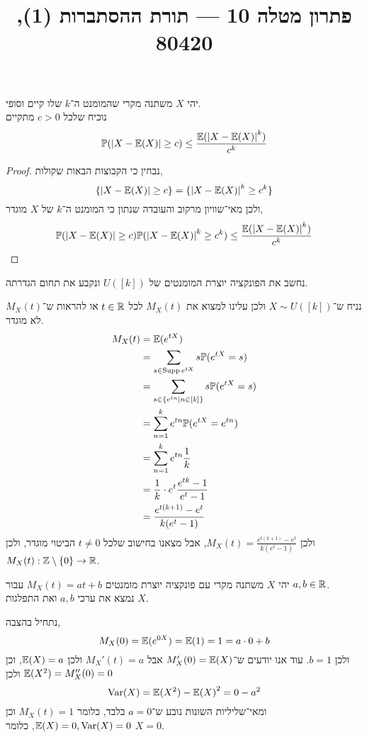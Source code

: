 
\title{פתרון מטלה 10 --- תורת ההסתברות (1), 80420}

\DeclareMathOperator{\Supp}{Supp}


\maketitle
\maketitleprint{}

\question{}
יהי $X$ משתנה מקרי שהמומנט ה־$k$ שלו קיים וסופי. \\
נוכיח שלכל $c > 0$ מתקיים
\[
	\mathbb{P}(|X - \mathbb{E}(X)| \ge c)
	\le \frac{\mathbb{E}({\left\lvert X - \mathbb{E}(X)\right\rvert}^k)}{c^k}
\]
\begin{proof}
	נבחין כי הקבוצות הבאות שקולות,
	\[
		\{ |X - \mathbb{E}(X)| \ge c \}
		= \{ {|X - \mathbb{E}(X)|}^k \ge c^k \}
	\]
	ולכן מאי־שוויון מרקוב והעובדה שנתון כי המומנט ה־$k$ של $X$ מוגדר,
	\[
		\mathbb{P}(|X - \mathbb{E}(X)| \ge c)
		\mathbb{P}({|X - \mathbb{E}(X)|}^k \ge c^k)
		\le \frac{\mathbb{E}({|X - \mathbb{E}(X)|}^k)}{c^k}
	\]
\end{proof}

\question{}
נחשב את הפונקציה יוצרת המומנטים של $U([k])$ ונקבע את תחום הגדרתה.
\begin{solution}
	נניח ש־$X \sim U([k])$ ולכן עלינו למצוא את $M_X(t)$ לכל $t \in \mathbb{R}$ או להראות ש־$M_X(t)$ לא מוגדר.
	\begin{align*}
		M_X(t)
		& = \mathbb{E}(e^{t X}) \\
		& = \sum_{s \in \operatorname{Supp} e^{t X}} s \mathbb{P}(e^{t X} = s) \\
		& = \sum_{s \in \{ e^{tn} \mid n \in [k]\}} s \mathbb{P}(e^{t X} = s) \\
		& = \sum_{n = 1}^{k} e^{tn} \mathbb{P}(e^{tX} = e^{tn}) \\
		& = \sum_{n = 1}^{k} e^{tn} \frac{1}{k} \\
		& = \frac{1}{k} \cdot e^t \frac{e^{tk} - 1}{e^t - 1} \\
		& = \frac{e^{t(k + 1)} - e^t}{k(e^t - 1)}
	\end{align*}
	ולכן $M_X(t) = \frac{e^{t(k + 1)} - e^t}{k(e^t - 1)}$, אבל מצאנו בחישוב שלכל $t \ne 0$ הביטוי מוגדר, ולכן $M_X(t) : \mathbb{Z} \setminus \{ 0 \} \to \mathbb{R}$.
\end{solution}

\question{}
יהי $X$ משתנה מקרי עם פונקציה יוצרת מומנטים $M_X(t) = at + b$ עבור $a, b \in \mathbb{R}$. \\
נמצא את ערכי $a, b$ ואת התפלגות $X$.
\begin{solution}
	נתחיל בהצבה,
	\[
		M_X(0)
		= \mathbb{E}(e^{0X})
		= \mathbb{E}(1)
		= 1
		= a \cdot 0 + b
	\]
	ולכן $b = 1$.
	עוד אנו יודעים ש־$M_X'(0) = \mathbb{E}(X)$ אבל $M_X'(t) = a$ ולכן $\mathbb{E}(X) = a$, וכן $\mathbb{E}(X^2) = M_X''(0) = 0$ ולכן
	\[
		\operatorname{Var}(X)
		= \mathbb{E}(X^2) - {\mathbb{E}(X)}^2
		= 0 - a^2
	\]
	ומאי־שליליות השונות נובע ש־$a = 0$ בלבד, כלומר $M_X(t) = 1$ וכן $\mathbb{E}(X) = 0, \operatorname{Var}(X) = 0$, כלומר $X = 0$.
\end{solution}


